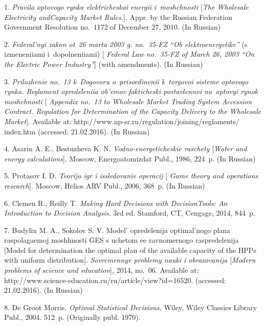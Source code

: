 


{\footnotesize

\vskip 4mm


\vskip 3mm

1. {\it Pravila optovogo rynka elektricheskoi energii
i~moshchnosti} [{\it The Wholesale Electricity
and\linebreak\newpage\noindent Capacity Market Rules.}]. Appr. by
the Russian Federation Government Resolution no.~1172 of December
27, 2010.  (In Russian)

2. {\it Federal'nyi zakon ot~26 marta 2003 g. no.~35-FZ ``Ob
elektroenergetike''} (s izmeneniiami i~dopolneniiami) [{\it
Federal Law no.~35-FZ of March 26, 2003 ``On the Electric Power
Industry''}] (with amendments). (In Russian)

3. {\it Prilozhenie no.~13 k~Dogovoru  o~prisoedinenii k~torgovoi
sisteme  optovogo  rynka.  Reglament  opredeleniia ob'emov
fakticheski  postavlennoi  na~optovyi  rynok moshchnosti} [{\it
Appendix no.~13 to Wholesale Market Trading System Accession
Contract. Regulation for Determination of the Capacity Delivery to
the Wholesale Market}].  Available at:
http://www.np-sr.ru/regulation/joining/reglaments/ index.htm
(accessed: 21.02.2016). (In Russian)

4.  Asarin A. E., Bestuzheva K. N. {\it Vodno-energeticheskie
raschety} [{\it Water and energy calculations}]. Moscow,
Energoatomizdat Publ., 1986, 224~p. (In Russian)

5. Protasov I. D. {\it Teorija igr i issledovanie operacij} [{\it
Game theory and operations research}]. Moscow, Helios ARV Publ.,
2006, 368~p. (In Russian)


6.  Clemen R., Reilly T. {\it Making Hard Decisions with
DecisionTools: An Introduction to Decision Analysis.} 3rd ed.
Stamford, CT, Cengage, 2014, 844~p.


7.  Budylin M. A., Sokolov S. V. Model' opredelenija optimal'nogo
plana raspolagaemoj moshhnosti GES s uchetom ee ravnomernogo
raspredelenija [Model for determination the optimal plan of the
available capacity of the HPPs with uniform distribution]. {\it
Sovremennye problemy nauki i obrazovanija} [{\it Modern problems
of science and education}], 2014, no.~06. Available at:
http://www.science-education.ru/ru/article/view?id=16520.
(accessed: 21.02.2016). (In Russian)


8.   De Groot Morris. {\it Optimal Statistical Decisions.} Wiley,
Wiley Classics Library Publ., 2004. 512~p. (Originally publ.
1970).





}
